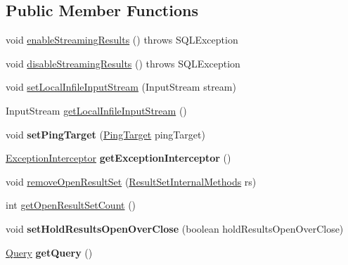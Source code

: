 \subsection*{Public Member Functions}
\begin{DoxyCompactItemize}
\item 
void \mbox{\hyperlink{interfacecom_1_1mysql_1_1cj_1_1jdbc_1_1_jdbc_statement_a35049f45e6278dc1b824812acbe75556}{enable\+Streaming\+Results}} ()  throws S\+Q\+L\+Exception
\item 
void \mbox{\hyperlink{interfacecom_1_1mysql_1_1cj_1_1jdbc_1_1_jdbc_statement_a11240571041f264e6bdde12ee05355a5}{disable\+Streaming\+Results}} ()  throws S\+Q\+L\+Exception
\item 
void \mbox{\hyperlink{interfacecom_1_1mysql_1_1cj_1_1jdbc_1_1_jdbc_statement_a89093285d02aa790bb07c7afab7c4140}{set\+Local\+Infile\+Input\+Stream}} (Input\+Stream stream)
\item 
Input\+Stream \mbox{\hyperlink{interfacecom_1_1mysql_1_1cj_1_1jdbc_1_1_jdbc_statement_a1f5ddb4f3f7ad5c677a27d5350568eac}{get\+Local\+Infile\+Input\+Stream}} ()
\item 
\mbox{\label{interfacecom_1_1mysql_1_1cj_1_1jdbc_1_1_jdbc_statement_a7cf024a169c62cd9acbd867518a82dfc}} 
void {\bfseries set\+Ping\+Target} (\mbox{\hyperlink{interfacecom_1_1mysql_1_1cj_1_1_ping_target}{Ping\+Target}} ping\+Target)
\item 
\mbox{\label{interfacecom_1_1mysql_1_1cj_1_1jdbc_1_1_jdbc_statement_acaa2fa9b43fdb8d5020efed654034d53}} 
\mbox{\hyperlink{interfacecom_1_1mysql_1_1cj_1_1exceptions_1_1_exception_interceptor}{Exception\+Interceptor}} {\bfseries get\+Exception\+Interceptor} ()
\item 
void \mbox{\hyperlink{interfacecom_1_1mysql_1_1cj_1_1jdbc_1_1_jdbc_statement_a5af1b0ade448d8559094223309113243}{remove\+Open\+Result\+Set}} (\mbox{\hyperlink{interfacecom_1_1mysql_1_1cj_1_1jdbc_1_1result_1_1_result_set_internal_methods}{Result\+Set\+Internal\+Methods}} rs)
\item 
int \mbox{\hyperlink{interfacecom_1_1mysql_1_1cj_1_1jdbc_1_1_jdbc_statement_ad7367340b87accdd66c01872ebaddbcd}{get\+Open\+Result\+Set\+Count}} ()
\item 
\mbox{\label{interfacecom_1_1mysql_1_1cj_1_1jdbc_1_1_jdbc_statement_acf4340a52d236d444fa9584b3f9cc43b}} 
void {\bfseries set\+Hold\+Results\+Open\+Over\+Close} (boolean hold\+Results\+Open\+Over\+Close)
\item 
\mbox{\label{interfacecom_1_1mysql_1_1cj_1_1jdbc_1_1_jdbc_statement_a6ebd2f09956035be03e076980dce5528}} 
\mbox{\hyperlink{interfacecom_1_1mysql_1_1cj_1_1_query}{Query}} {\bfseries get\+Query} ()
\end{DoxyCompactItemize}
